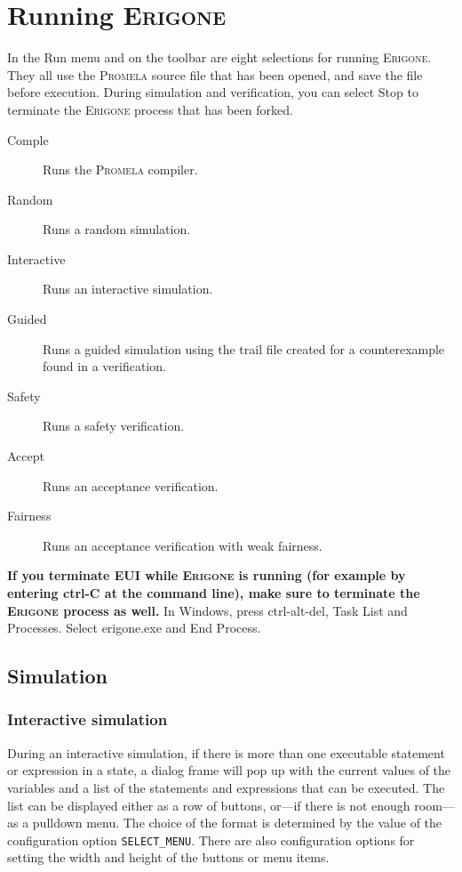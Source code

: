\documentclass[11pt]{article}
\newcommand{\eri}{\textsc{Erigone}}
\newcommand{\prm}{\textsc{Promela}}
\newcommand{\eui}{\textsc{EUI}}
\newcommand{\p}[1]{\texttt{#1}}
\newcommand{\bu}[1]{\textsf{#1}}
\begin{document}
\section{Running \eri{}}\label{s.run}
In the \bu{Run} menu and on the toolbar are eight selections for
running \eri{}. They all use the \prm{} source file that has been opened,
and save the file before execution.
During simulation and verification,
you can select \bu{Stop} to terminate the \eri{} process that has been forked.
\begin{description}
\item[\bu{Comple}] Runs the \prm{} compiler.
\item[\bu{Random}] Runs a random simulation.
\item[\bu{Interactive}] Runs an interactive simulation.
\item[\bu{Guided}] Runs a guided simulation using the trail
file created for a counterexample found in a verification.
\item[\bu{Safety}] Runs a safety verification.
\item[\bu{Accept}] Runs an acceptance verification.
\item[\bu{Fairness}] Runs an acceptance verification with weak fairness.
\end{description}

\textbf{If you terminate \eui{} while \eri{} is running (for example by
entering \bu{ctrl-C} at the command line), make sure to terminate the
\eri{} process as well.} In Windows, press \bu{ctrl-alt-del}, \bu{Task
List} and \bu{Processes}. Select \bu{erigone.exe} and \bu{End Process}.

\subsection{Simulation}\label{s.sim}

\subsubsection{Interactive simulation}

During an interactive simulation, if there is more than one executable
statement or expression in a state, a dialog frame will pop up with the
current values of the variables and a list of the statements and
expressions that can be executed. The list can be displayed either as a
row of buttons, or---if there is not enough room---as a pulldown menu.
The choice of the format is determined by the value of the configuration
option \p{SELECT\_MENU}. There are also configuration options for
setting the width and height of the buttons or menu items.
\end{document}
